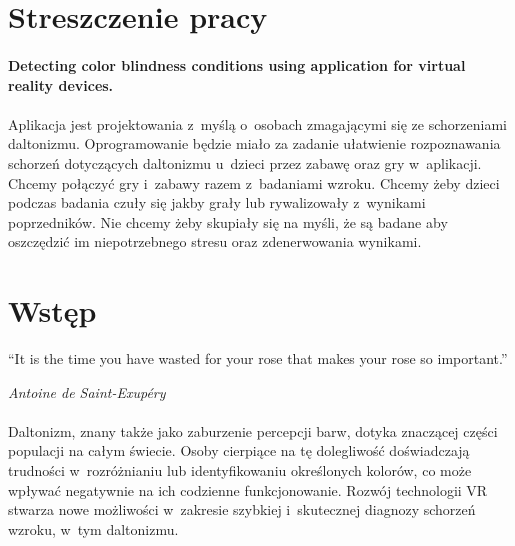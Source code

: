 \documentclass[12pt, letterpaper]{article}
\begin{document}
\setlength{\parindent}{1cm}
\newpage

\section{Streszczenie pracy}
\paragraph{}
\textbf{Detecting color blindness conditions using application for virtual reality devices.}

\paragraph{}
Aplikacja jest projektowania z~myślą o~osobach zmagającymi się ze schorzeniami daltonizmu. Oprogramowanie będzie miało za zadanie ułatwienie rozpoznawania schorzeń dotyczących daltonizmu u~dzieci przez zabawę oraz gry w~aplikacji. Chcemy połączyć gry i~zabawy razem z~badaniami wzroku. Chcemy żeby dzieci podczas badania czuły się jakby grały lub rywalizowały z~wynikami poprzedników. Nie chcemy żeby skupiały się na myśli, że są badane aby oszczędzić im niepotrzebnego stresu oraz zdenerwowania wynikami.

\newpage
\tableofcontents

\newpage

\section{Wstęp}

\epigraph{“It is the time you have wasted for your rose that makes your rose so important.”}{\textit{Antoine de Saint-Exupéry}}

\paragraph{}
Daltonizm, znany także jako zaburzenie percepcji barw, dotyka znaczącej części populacji na całym świecie. Osoby cierpiące na tę dolegliwość doświadczają trudności w~rozróżnianiu lub identyfikowaniu określonych kolorów, co może wpływać negatywnie na ich codzienne funkcjonowanie. Rozwój technologii VR stwarza nowe możliwości w~zakresie szybkiej i~skutecznej diagnozy schorzeń wzroku, w~tym daltonizmu. 
\end{document}
